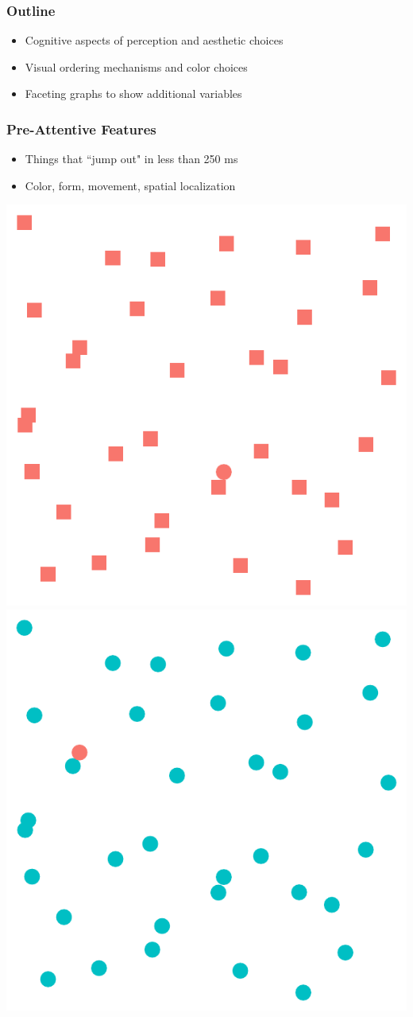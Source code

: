 \documentclass{beamer}
\begin{document}
\begin{frame}
\frametitle{Outline}
\begin{itemize}
\item Cognitive aspects of perception and aesthetic choices\bigskip
\item Visual ordering mechanisms and color choices\bigskip
\item Faceting graphs to show additional variables\bigskip
\end{itemize}
\end{frame}


\begin{frame}
\frametitle{Pre-Attentive Features}
\begin{itemize}
\item Things that ``jump out" in less than 250 ms\medskip
\item Color, form, movement, spatial localization
\end{itemize}
\hfil\includegraphics[width=.4\linewidth]{figure/preattentive11}\hspace{20pt}
\includegraphics[width=.4\linewidth]{figure/preattentive12}
\end{frame}

\end{document}
